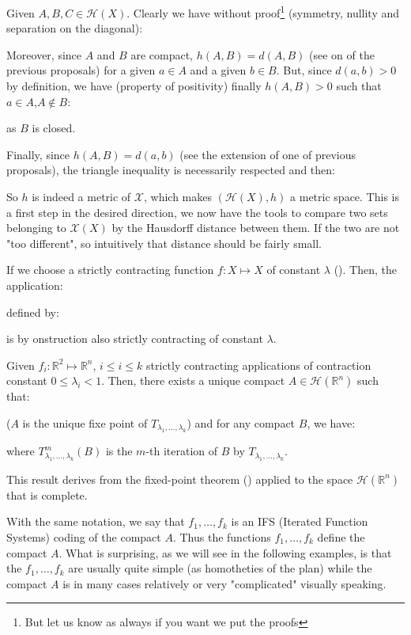 	Given $A,B,C\in \mathcal{H}(X)$. Clearly we have without proof\footnote{But let us know as always if you want we put the proofs} (symmetry, nullity and separation on the diagonal):
	
	Moreover, since $A$ and $B$ are compact, $h(A,B)=d(A,B)$ (see on of the previous proposals) for a given $a\in A$ and a given $b\in B$. But, since $d(a,b)>0$ by definition, we have (property of positivity) finally $h(A,B)>0$ such that $a\in A$,$A\notin B$:
	
	as $B$ is closed.
	
	Finally, since $h(A,B)=d(a,b)$ (see the extension of one of previous proposals), the triangle inequality is necessarily respected and then:
	
	So $h$ is indeed a metric of $\mathcal{X}$, which makes $(\mathcal{H}(X),h)$ a metric space. This is a first step in the desired direction, we now have the tools to compare two sets belonging to $\mathcal{X}(X)$ by the Hausdorff distance between them. If the two are not "too different", so intuitively that distance should be fairly small.
	
	If we choose a strictly contracting function $f:X\mapsto X$ of constant $\lambda$ (). Then, the application:
	
	defined by:
	
	is by onstruction also strictly contracting of constant $\lambda$.
	
	Given $f_i:\mathbb{R}^2\mapsto \mathbb{R}^n$, $i\leq i\leq k$ strictly contracting applications of contraction constant  $0\leq \lambda_i<1$. Then, there exists a unique compact $A\in\mathcal{H}(\mathbb{R}^n)$ such that:
	
	($A$ is the unique fixe point of $T_{\lambda_1,\ldots,\lambda_k}$) and for any compact $B$, we have:
	
	where $T_{\lambda_1,\ldots,\lambda_k}^m(B)$ is the $m$-th iteration of $B$ by $T_{\lambda_1,\ldots,\lambda_k}$.
	
	This result derives from the fixed-point theorem () applied to the space $\mathcal{H}(\mathbb{R}^n)$ that is complete.

	With the same notation, we say that $f_1,\ldots,f_k$ is an IFS (Iterated Function Systems) coding of the compact $A$. Thus the functions $f_1,\ldots,f_k$ define the compact $A$. What is surprising, as we will see in the following examples, is that the $f_1,\ldots,f_k$ are usually quite simple (as homotheties of the plan) while the compact $A$ is in many cases relatively or very "complicated" visually speaking.

